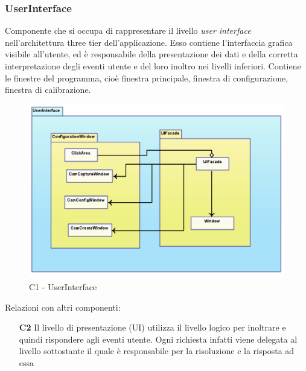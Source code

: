 \subsubsection{UserInterface} \label{sec:c1}
Componente che si occupa di rappresentare il livello \textit{user interface} nell'architettura three tier dell'applicazione. Esso contiene l'interfaccia grafica visibile all'utente, ed è responsabile della presentazione dei dati e della corretta interpretazione degli eventi utente e del loro inoltro nei livelli inferiori. Contiene le finestre del programma, cioè finestra principale, finestra di configurazione, finestra di calibrazione. \\
\begin{figure}[!h] 

        \centering 

        \includegraphics[scale=0.4]{./images/c1.png} 

        \caption{C1 - UserInterface} 

        \label{fig:c1}

        \end{figure} 

Relazioni con altri componenti: 
\begin{itemize} 
\item [\textbf{C2}]
Il livello di presentazione (UI) utilizza il livello logico per inoltrare e quindi rispondere agli eventi utente. Ogni richiesta infatti viene delegata al livello sottostante il quale è responsabile per la risoluzione e la risposta ad essa 
\end{itemize} 

